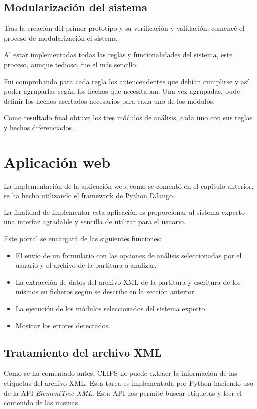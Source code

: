 \subsection{Modularización del sistema}

Tras la creación del primer prototipo y su verificación y validación, comencé el proceso de modularización el sistema. 

Al estar implementadas todas las reglas y funcionalidades del sistema, este proceso, aunque tedioso, fue el más sencillo. 

Fui comprobando para cada regla los antencendentes que debían cumplirse y así poder agruparlas según los hechos que necesitaban.
Una vez agrupadas, pude definir los hechos asertados necesarios para cada uno de los módulos.

Como resultado final obtuve los tres módulos de análisis, cada uno con sus reglas y hechos diferenciados. 

\section{Aplicación web}

La implementación de la aplicación web, como se comentó en el capítulo anterior, se ha hecho utilizando el framework de Python DJango.

La finalidad de implementar esta aplicación es proporcionar al sistema experto una interfaz agradable y sencilla de utilizar para el usuario. 

Este portal se encargará de las siguientes funciones:
\begin{itemize} 
	\item El envío de un formulario con las opciones de análisis seleccionadas por el usuario y el archivo de la partitura a analizar.
	\item La extracción de datos del archivo XML de la partitura y escritura de los mismos en ficheros según se describe en la sección anterior.
	\item La ejecución de los módulos seleccionados del sistema experto.
	\item Mostrar los errores detectados.
\end{itemize}

\subsection{Tratamiento del archivo XML}

Como se ha comentado antes, CLIPS no puede extraer la información de las etiquetas del archivo XML. Esta tarea es implementada por Python haciendo uso de la API \textit{ElementTree XML}. Esta API nos permite buscar etiquetas y leer el contenido de las mismas. 

